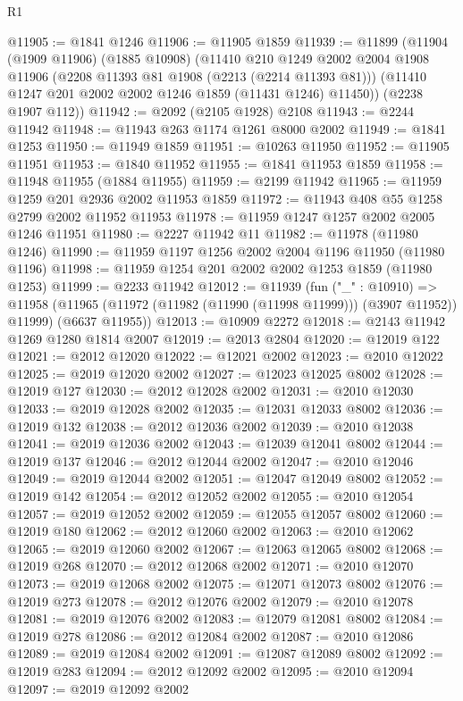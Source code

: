 \begin{lexlean}{R1}
\begin{coremodule}
@11905 := @1841 @1246
@11906 := @11905 @1859
@11939 := @11899
    (@11904
      (@1909 @11906)
      (@1885 @10908)
      (@11410
        @210
        @1249
        @2002
        @2004
        @1908
        @11906
        (@2208 @11393 @81 @1908 (@2213 (@2214 @11393 @81)))
        (@11410 @1247 @201 @2002 @2002 @1246 @1859 (@11431 @1246) @11450))
      (@2238 @1907 @112))
@11942 := @2092 (@2105 @1928) @2108
@11943 := @2244 @11942
@11948 := @11943 @263 @1174 @1261 @8000 @2002
@11949 := @1841 @1253
@11950 := @11949 @1859
@11951 := @10263 @11950
@11952 := @11905 @11951
@11953 := @1840 @11952
@11955 := @1841 @11953 @1859
@11958 := @11948 @11955 (@1884 @11955)
@11959 := @2199 @11942
@11965 := @11959 @1259 @201 @2936 @2002 @11953 @1859
@11972 := @11943 @408 @55 @1258 @2799 @2002 @11952 @11953
@11978 := @11959 @1247 @1257 @2002 @2005 @1246 @11951
@11980 := @2227 @11942 @11
@11982 := @11978 (@11980 @1246)
@11990 := @11959 @1197 @1256 @2002 @2004 @1196 @11950 (@11980 @1196)
@11998 := @11959 @1254 @201 @2002 @2002 @1253 @1859 (@11980 @1253)
@11999 := @2233 @11942
@12012 := @11939
    (fun ("_" : @10910) =>
    @11958 (@11965 (@11972 (@11982 (@11990 (@11998 @11999))) (@3907 @11952)) @11999) (@6637 @11955))
@12013 := @10909 @2272
@12018 := @2143 @11942 @1269 @1280 @1814 @2007
@12019 := @2013 @2804
@12020 := @12019 @122
@12021 := @2012 @12020
@12022 := @12021 @2002
@12023 := @2010 @12022
@12025 := @2019 @12020 @2002
@12027 := @12023 @12025 @8002
@12028 := @12019 @127
@12030 := @2012 @12028 @2002
@12031 := @2010 @12030
@12033 := @2019 @12028 @2002
@12035 := @12031 @12033 @8002
@12036 := @12019 @132
@12038 := @2012 @12036 @2002
@12039 := @2010 @12038
@12041 := @2019 @12036 @2002
@12043 := @12039 @12041 @8002
@12044 := @12019 @137
@12046 := @2012 @12044 @2002
@12047 := @2010 @12046
@12049 := @2019 @12044 @2002
@12051 := @12047 @12049 @8002
@12052 := @12019 @142
@12054 := @2012 @12052 @2002
@12055 := @2010 @12054
@12057 := @2019 @12052 @2002
@12059 := @12055 @12057 @8002
@12060 := @12019 @180
@12062 := @2012 @12060 @2002
@12063 := @2010 @12062
@12065 := @2019 @12060 @2002
@12067 := @12063 @12065 @8002
@12068 := @12019 @268
@12070 := @2012 @12068 @2002
@12071 := @2010 @12070
@12073 := @2019 @12068 @2002
@12075 := @12071 @12073 @8002
@12076 := @12019 @273
@12078 := @2012 @12076 @2002
@12079 := @2010 @12078
@12081 := @2019 @12076 @2002
@12083 := @12079 @12081 @8002
@12084 := @12019 @278
@12086 := @2012 @12084 @2002
@12087 := @2010 @12086
@12089 := @2019 @12084 @2002
@12091 := @12087 @12089 @8002
@12092 := @12019 @283
@12094 := @2012 @12092 @2002
@12095 := @2010 @12094
@12097 := @2019 @12092 @2002

\end{coremodule}
\end{lexlean}
